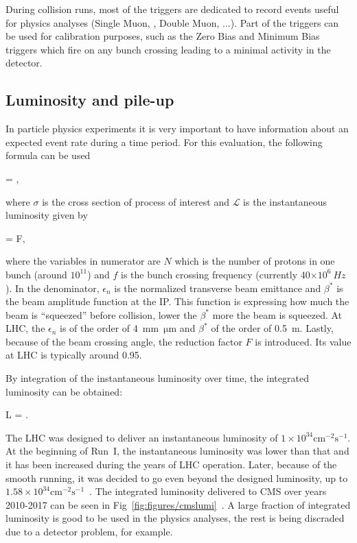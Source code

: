 
During collision runs, most of the triggers are dedicated to record events useful for physics analyses (Single Muon, \MET, Double Muon, ...). Part of the triggers can be used for calibration purposes, such as the Zero Bias and Minimum Bias triggers which fire on any bunch crossing leading to a minimal activity in the detector.

\subsection{Luminosity and pile-up}

In particle physics experiments it is very important to have information about an expected event rate during a time period. For this evaluation, the following formula can be used

{
  = \sigma \times {},
}

where $\sigma$ is the cross section of process of interest and $\mathcal{L}$ is the instantaneous luminosity given by

{
  = F,
}

where the variables in numerator are $N$ which is the number of protons in one bunch (around $10^{11}$) and $f$ is the bunch crossing frequency (currently 40$\times 10^{6}~Hz$). In the denominator, $\epsilon_{n}$ is the normalized transverse beam emittance and $\beta^{*}$ is the beam amplitude function at the IP. This function is expressing how much the beam is ``squeezed'' before collision, lower the $\beta^{*}$ more the beam is squeezed. At LHC, the  $\epsilon_{n}$ is of the order of 4~mm~$\mathrm{\mu m}$ and $\beta^{*}$ of the order of 0.5~m. Lastly, because of the beam crossing angle, the reduction factor $F$ is introduced. Its value at LHC is typically around 0.95.

By integration of the instantaneous luminosity over time, the integrated luminosity can be obtained:

{
 L = .
}

The LHC was designed to deliver an instantaneous luminosity of $1 \times 10^{34} \mathrm{cm^{-2}s^{-1}}$. At the beginning of Run~I, the instantaneous luminosity was lower than that and it has been increased during the years of LHC operation. Later, because of the smooth running, it was decided to go even beyond the designed luminosity, up to $1.58 \times 10^{34} \mathrm{cm^{-2}s^{-1}}$~\cite{Pralavorio:2272474}. The integrated luminosity delivered to CMS over years 2010-2017 can be seen in Fig~\ref{fig:figures/cmslumi}~\cite{website:CMSlumi}. A large fraction of integrated luminosity is good to be used in the physics analyses, the rest is being discraded due to a detector problem, for example. 


